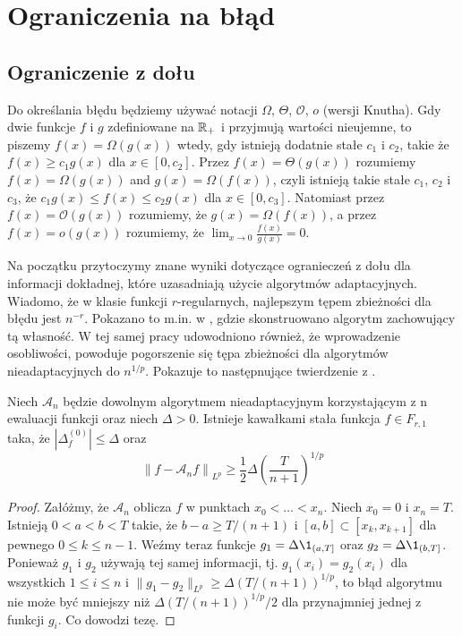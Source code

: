 \documentclass[oik, pdftex, robocza, man]{mgrwms}
\begin{document}
\mgrclosechapter


\chapter{Ograniczenia na błąd}


\section{Ograniczenie z dołu}


    Do określania błędu będziemy używać notacji $\varOmega$, $\varTheta$, $\mathcal{O}$, $\textit{o}$ (wersji Knutha). Gdy dwie funkcje $f$ i $g$ zdefiniowane na $\mathbb{R}_{+}$ i przyjmują wartości nieujemne, to piszemy $f(x) = \varOmega\left( g(x) \right)$ wtedy, gdy istnieją dodatnie stałe $c_{1}$ i $c_{2}$, takie że $f(x) \geq c_{1} g(x)$ dla $x \in [0, c_{2}]$. Przez $f(x) = \varTheta\left( g(x) \right)$ rozumiemy $f(x) = \varOmega\left( g(x) \right)$ and $g(x) = \varOmega\left( f(x) \right)$, czyli istnieją takie stałe $c_{1}$, $c_{2}$ i $c_{3}$, że $c_{1} g(x) \leq f(x) \leq c_{2} g(x)$ dla $x \in [0, c_{3}]$. Natomiast przez $f(x) = \mathcal{O}(g(x))$ rozumiemy, że $g(x) = \varOmega(f(x))$, a przez $f(x) = \textit{o}(g(x))$ rozumiemy, że $\displaystyle \lim_{x \rightarrow 0} \frac{f(x)}{g(x)} = 0$.

    Na początku przytoczymy znane wyniki dotyczące ogranieczeń z dołu dla informacji dokładnej, które uzasadniają użycie algorytmów adaptacyjnych. Wiadomo, że w klasie funkcji $r$-regularnych, najlepszym tępem zbieżności dla błędu jest $n^{-r}$. Pokazano to m.in. w \cite{PoA}, gdzie skonstruowano algorytm zachowujący tą własność. W tej samej pracy udowodniono również, że wprowadzenie osobliwości, powoduje pogorszenie się tępa zbieżności dla algorytmów nieadaptacyjnych do $n^{1/p}$. Pokazuje to następnujące twierdzenie z \cite{PoA}.

    \begin{thm}
        Niech $\mathcal{A}_{n}$ będzie dowolnym algorytmem nieadaptacyjnym korzystającym z n ewaluacji funkcji oraz niech $\Delta > 0$. Istnieje kawałkami stała funkcja $f \in F_{r, 1}$ taka, że $|\Delta_{f}^{(0)}| \leq \Delta$ oraz
        \begin{equation*}
            \left\| f - \mathcal{A}_{n}f \right\|_{L^{p}} \geq \frac{1}{2}\Delta \left( \frac{T}{n+1} \right)^{1/p}
        \end{equation*}
    \end{thm}
    \begin{proof}
        Załóżmy, że $\mathcal{A}_{n}$ oblicza $f$ w punktach $x_{0} < \ldots < x_{n}$. Niech $x_{0} = 0$ i $x_{n} = T$. Istnieją $0 < a < b < T$ takie, że $b-a \geq T/(n+1)$ i $[a,b] \subset [x_{k}, x_{k+1}]$ dla pewnego $0 \leq k \leq n-1$. Weźmy teraz funkcje $g_{1} = \Delta\1_{(a, T]}$ oraz $g_{2} = \Delta\1_{(b, T]}$. Ponieważ $g_{1}$ i $g_{2}$ używają tej samej informacji, tj. $g_{1}(x_{i}) = g_{2}(x_{i})$ dla wszystkich $1 \leq i \leq n$ i $\| g_{1} - g_{2} \|_{L^{p}} \geq \Delta(T / (n+1))^{1/p}$, to błąd algorytmu nie może być mniejszy niż $\Delta(T/(n+1))^{1/p} / 2$ dla przynajmniej jednej z funkcji $g_{i}$. Co dowodzi tezę.
    \end{proof}
\end{document}
